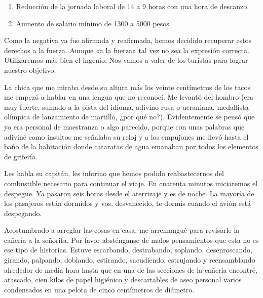 \documentclass[12pt,twoside,openright,a5paper]{book}
\begin{document}
\begin{enumerate}
\item Reducción de la jornada laboral de 14 a 9 horas con una hora de descanzo.
\item Aumento de salario mínimo de 1300 a 5000 pesos.
\end{enumerate}

Como la negativa ya fue afirmada y reafirmada, hemos decidido recuperar
estos derechos a la fuerza. Aunque «a la fuerza» tal vez no sea la expresión
correcta. Utilizaremos más bien el ingenio. Nos vamos a valer de los turistas
para lograr nuestro objetivo.


\vspace{0.5cm}
\hrulefill\hspace{0.2cm} \decofourleft\decofourright \hspace{0.2cm} \hrulefill
\vspace{0.5cm}

La chica que me miraba desde su altura más los veinte centímetros de
los tacos me empezó a hablar en una lengua que no reconocí. Me levantó
del hombro (era muy fuerte, sumado a la pista del idioma, adivino rusa o
ucraniana, medallista olímpica de lanzamiento de martillo, ¿por qué
no?). Evidentemente se pensó que yo era personal de maestranza o algo
parecido, porque con unas palabras que adiviné como insultos me señalaba
su reloj y a los empujones me llevó hasta el baño de la habitación donde
cataratas de agua emanaban por todos los elementos de grifería.


\vspace{0.5cm}
\hrulefill\hspace{0.2cm} \decofourleft\decofourright \hspace{0.2cm} \hrulefill
\vspace{0.5cm}

Les habla su capitán, les informo que hemos podido reabastecernos
del combustible necesario para continuar el viaje. En cuarenta minutos
iniciaremos el despegue. Ya pasaron seis horas desde el aterrizaje y es
de noche. La mayoría de los pasajeros están dormidos y vos, desvanecido,
te dormís cuando el avión está despegando.


\vspace{0.5cm}
\hrulefill\hspace{0.2cm} \decofourleft\decofourright \hspace{0.2cm} \hrulefill
\vspace{0.5cm}

  Acostumbrado a
arreglar las cosas en casa, me arremangué para revisarle la cañería a
la señorita. Por favor absténganse de malos pensamientos que esta no es ese
tipo de historias. Estuve escarbando, destrabando, soplando, desenroscando,
girando, palpando, doblando, estirando, sacudiendo, estrujando y reensamblando
alrededor de media hora hasta que en una de las secciones de la cañería
encontré, atascado, cien kilos de papel higiénico y descartables de aseo
personal varios condensados en una pelota de cinco centímetros de diámetro.
\end{document}
